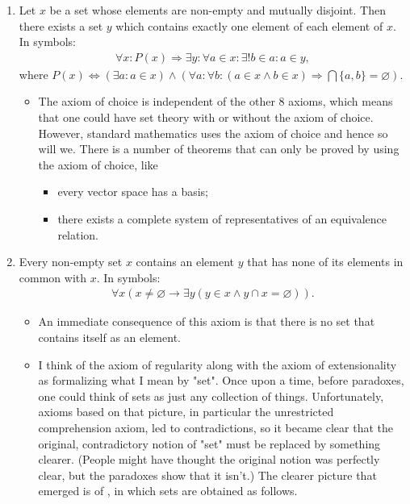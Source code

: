 \documentclass{article}
\begin{document}
\begin{enumerate}
\item {} Let $x$ be a set whose elements are non-empty and mutually disjoint. Then there exists a set $y$ which contains exactly one element of each element of $x$. In symbols:
\begin{align*}
\forall x: P(x) \Rightarrow \exists y: \forall a \in x: \exists ! b \in a: a \in y,
\end{align*}
where $P(x) \Leftrightarrow(\exists a: a \in x) \wedge(\forall a: \forall b:(a \in x \wedge b \in x) \Rightarrow \bigcap\{a, b\}=\varnothing)$.
\begin{itemize}
    \item The axiom of choice is independent of the other 8 axioms, which means that one could have set theory with or without the axiom of choice. However, standard mathematics uses the axiom of choice and hence so will we. There is a number of theorems that can only be proved by using the axiom of choice, like
    \begin{itemize}[$\ast$]
        \item every vector space has a basis;
        \item there exists a complete system of representatives of an equivalence relation.
    \end{itemize}
\end{itemize}
\item {} Every non-empty set $x$ contains an element $y$ that has none of its elements in common with $x$. In symbols:
\begin{align*}
\forall x(x \neq \varnothing \rightarrow \exists y(y \in x \wedge y \cap x=\varnothing)) .
\end{align*}
\begin{itemize}
    \item An immediate consequence of this axiom is that there is no set that contains itself as an element.
    \item {\tiny I think of the axiom of regularity along with the axiom of extensionality as formalizing what I mean by "set". Once upon a time, before paradoxes, one could think of sets as just any collection of things. Unfortunately, axioms based on that picture, in particular the unrestricted comprehension axiom, led to contradictions, so it became clear that the original, contradictory notion of "set" must be replaced by something clearer. (People might have thought the original notion was perfectly clear, but the paradoxes show that it isn't.) The clearer picture that emerged is of , in which sets are obtained as follows.
    
}
\end{itemize}
\end{enumerate}
\end{document}
